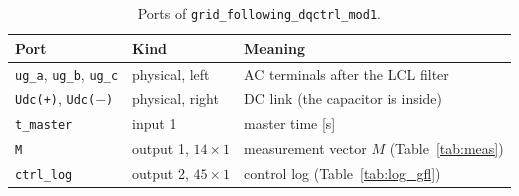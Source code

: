 \documentclass[11pt,a4paper]{scrartcl}
\newcommand{\code}[1]{\texttt{#1}}
\begin{document}
\begin{onehalfspace}
\begin{table}[H]
	\centering
	\captionsetup{width=0.9\textwidth, font=small}
	\caption[Ports of the grid-following block.]{Ports of \code{grid\_following\_dqctrl\_mod1}.}
	\label{tab:ports_gfl}
	\begin{tabularx}{0.95\textwidth}{@{} l l X @{}}
		\toprule
		\textbf{Port} & \textbf{Kind} & \textbf{Meaning} \\
		\midrule
		\code{ug\_a}, \code{ug\_b}, \code{ug\_c} & physical, left & AC terminals after the LCL filter \\
		\code{Udc(+)}, \code{Udc($-$)} & physical, right & DC link (the capacitor is inside) \\
		\code{t\_master} & input 1 & master time [\si{\second}] \\
		\code{M} & output 1, $14 \times 1$ & measurement vector $M$ (Table~\ref{tab:meas}) \\
		\code{ctrl\_log} & output 2, $45 \times 1$ & control log (Table~\ref{tab:log_gfl}) \\
		\bottomrule
	\end{tabularx}
\end{table}


\end{onehalfspace}
\end{document}
